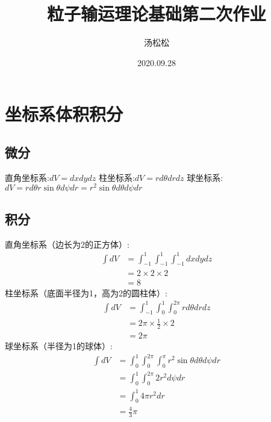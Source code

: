 \documentclass[12pt]{ctexart}
\title{粒子输运理论基础第二次作业}
\author{汤松松 }
\date{2020.09.28}
\begin{document}
\maketitle

\section{坐标系体积积分}
\subsection{微分}
\noindent
直角坐标系:\quad$d V = d x d y d z$\newline
柱坐标系:\quad$d V = r d\theta d r dz$\newline
球坐标系:\quad$d V = r d\theta r\sin \theta d\psi d r = r ^ 2 \sin \theta d\theta d\psi d r$
\subsection{积分}
\noindent
直角坐标系（边长为2的正方体）:
\begin{align*}
    \int d V & = \int _{-1} ^{1} \int _{-1} ^{1} \int _{-1} ^{1} dx dy dz \\ & = 2 \times 2 \times 2 \\ & = 8
\end{align*}
柱坐标系（底面半径为1，高为2的圆柱体）:
\begin{align*}
    \int d V & = \int _{-1} ^{1} \int _{0} ^{1} \int _{0} ^{2\pi} r d\theta dr dz \\ & = 2 \pi \times \frac{1}{2} \times 2 \\ & = 2 \pi
\end{align*}
球坐标系（半径为1的球体）:
\begin{align*}
    \int d V & = \int _{0} ^{1} \int _{0} ^{2\pi} \int _{0} ^{\pi} r^2 \sin \theta d\theta d\psi dr \\ & = \int _{0} ^{1} \int _{0} ^{2\pi} 2r^2 d\psi dr \\ & = \int _{0} ^{1} 4\pi r^2 dr \\ & = \frac{4}{3} \pi
\end{align*}
\end{document}
